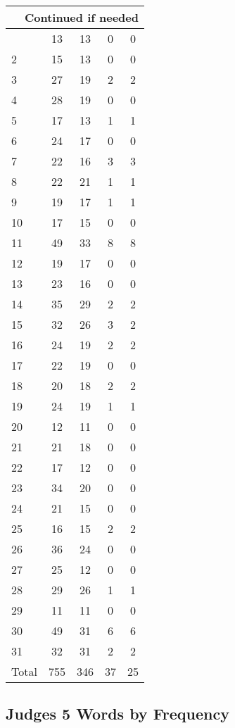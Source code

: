 \begin{center}
\begin{longtable}{l|c|c|c|c}
\hline \multicolumn{5}{|r|}{{Continued if needed}} \\ \hline
\endfoot 
1 & 13 & 13 & 0 & 0\\ \hline
2 & 15 & 13 & 0 & 0\\ \hline
3 & 27 & 19 & 2 & 2\\ \hline
4 & 28 & 19 & 0 & 0\\ \hline
5 & 17 & 13 & 1 & 1\\ \hline
6 & 24 & 17 & 0 & 0\\ \hline
7 & 22 & 16 & 3 & 3\\ \hline
8 & 22 & 21 & 1 & 1\\ \hline
9 & 19 & 17 & 1 & 1\\ \hline
10 & 17 & 15 & 0 & 0\\ \hline
11 & 49 & 33 & 8 & 8\\ \hline
12 & 19 & 17 & 0 & 0\\ \hline
13 & 23 & 16 & 0 & 0\\ \hline
14 & 35 & 29 & 2 & 2\\ \hline
15 & 32 & 26 & 3 & 2\\ \hline
16 & 24 & 19 & 2 & 2\\ \hline
17 & 22 & 19 & 0 & 0\\ \hline
18 & 20 & 18 & 2 & 2\\ \hline
19 & 24 & 19 & 1 & 1\\ \hline
20 & 12 & 11 & 0 & 0\\ \hline
21 & 21 & 18 & 0 & 0\\ \hline
22 & 17 & 12 & 0 & 0\\ \hline
23 & 34 & 20 & 0 & 0\\ \hline
24 & 21 & 15 & 0 & 0\\ \hline
25 & 16 & 15 & 2 & 2\\ \hline
26 & 36 & 24 & 0 & 0\\ \hline
27 & 25 & 12 & 0 & 0\\ \hline
28 & 29 & 26 & 1 & 1\\ \hline
29 & 11 & 11 & 0 & 0\\ \hline
30 & 49 & 31 & 6 & 6\\ \hline
31 & 32 & 31 & 2 & 2\\ \hline
Total & 755 & 346 & 37 & 25
\end{longtable}
\end{center}





\subsection{Judges 5 Words by Frequency}


